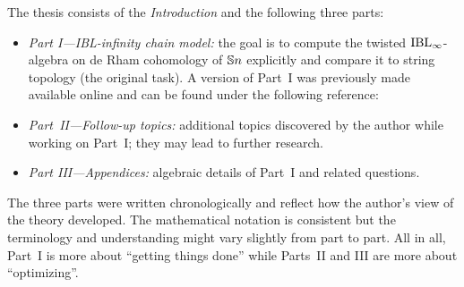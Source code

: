 \documentclass[\MainFolder/Text.tex]{subfiles}
\begin{document}

The thesis consists of the \emph{Introduction} and the following three parts:
\begin{itemize}
 \item \emph{Part I---IBL-infinity chain model:} the goal is to compute the twisted $\mathrm{IBL}_\infty$-algebra on de Rham cohomology of $\mathbb{S}{n}$ explicitly and compare it to string topology (the original task). A version of Part~I was previously made available online and can be found under the following reference: 
\begin{center}
\end{center}
 \item \emph{Part~II---Follow-up topics:} additional topics discovered by the author while working on Part~I; they may lead to further research.
 \item \emph{Part III---Appendices:} algebraic details of Part~I and related questions.
\end{itemize}

\noindent The three parts were written chronologically and reflect how the author's view of the theory developed. The mathematical notation is consistent but the terminology and understanding might vary slightly from part to part. All in all, Part~I is more about ``getting things done'' while Parts~II and III are more about ``optimizing''.
\end{document}
